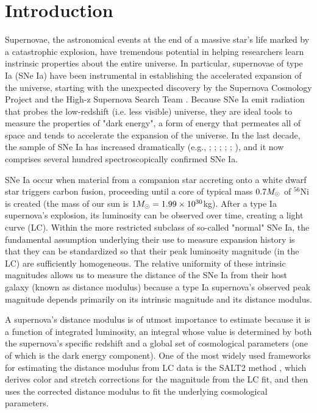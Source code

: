 \section{Introduction}
\label{sec:ode_introduction}

Supernovae, the astronomical events at the end of a massive star's life marked by a catastrophic explosion, have tremendous potential in helping researchers learn instrinsic properties about the entire universe. In particular, supernovae of type Ia (SNe Ia) have been instrumental in establishing the accelerated expansion of the universe, starting with the unexpected discovery by the Supernova Cosmology Project \citep{Riess+others:1998} and the High-z Supernova Search Team \citep{Perlmutter+others:1999}. Because SNe Ia emit radiation that probes the low-redshift (i.e. less visible) universe, they are ideal tools to measure the properties of "dark energy", a form of energy that permeates all of space and tends to accelerate the expansion of the universe. In the last decade, the sample of SNe Ia has increased dramatically (e.g., \citet{Wood-Vasey+others:2007}; \citet{Kowalski+others:2008}; \citet{Kessler+others:2009}; \citet{Contreras+others:2010}; \citet{Suzuki+others:2012}; \citet{Betoule+others:2014}), and it now comprises several hundred spectroscopically confirmed SNe Ia. 

SNe Ia occur when material from a companion star accreting onto a white dwarf star triggers carbon fusion, proceeding until a core of typical mass $0.7M_{\odot}$ of $^{56}$Ni is created (the mass of our sun is $1M_{\odot} = 1.99 \times 10^{30}$kg). After a type Ia supernova's explosion, its luminosity can be observed over time, creating a  light curve (LC). Within the more restricted subclass of so-called "normal" SNe Ia, the fundamental assumption underlying their use to measure expansion history is that they can be standardized so that their peak luminosity magnitude (in the LC) are sufficiently homogeneous. The relative uniformity of these intrinsic magnitudes allows us to measure the distance of the SNe Ia from their host galaxy (known as distance modulus) because a type Ia supernova's observed peak magnitude depends primarily on its intrinsic magnitude and its distance modulus.

A supernova's distance modulus is of utmost importance to estimate because it is a function of integrated luminosity, an integral whose value is determined by both the supernova's specific redshift and a global set of cosmological parameters (one of which is the dark energy component). One of the most widely used frameworks for estimating the distance modulus from LC data is the SALT2 method \citep{Guy+others:2005}, which derives color and stretch corrections for the magnitude from the LC fit, and then uses the corrected distance modulus to fit the underlying cosmological parameters. 


